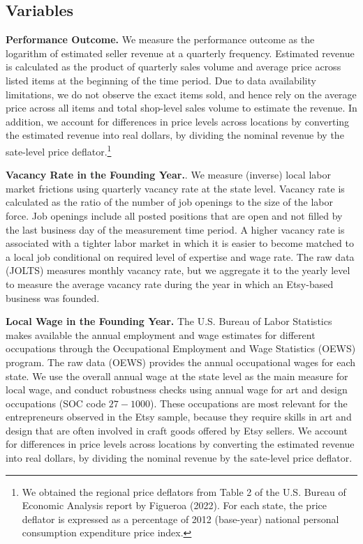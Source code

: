 \documentclass[letterpaper,12pt]{article}
\begin{document}

\subsection{Variables}

\textbf{Performance Outcome.} We measure the performance outcome as the logarithm of estimated seller revenue at a quarterly frequency. Estimated revenue is calculated as the product of quarterly sales volume and average price across listed items at the beginning of the time period. Due to data availability limitations, we do not observe the exact items sold, and hence rely on the average price across all items and total shop-level sales volume to estimate the revenue. In addition, we account for differences in price levels across locations by converting the estimated revenue into real dollars, by dividing the nominal revenue by the sate-level price deflator.\footnote{We obtained the regional price deflators from Table 2 of the U.S. Bureau of Economic Analysis report by Figueroa (2022). For each state, the price deflator is expressed as a percentage of 2012 (base-year) national personal consumption expenditure price index.}

\textbf{Vacancy Rate in the Founding Year.}. We measure (inverse) local labor market frictions using quarterly vacancy rate at the state level. Vacancy rate is calculated as the ratio of the number of job openings to the size of the labor force. Job openings include all posted positions that are open and not filled by the last business day of the measurement time period. A higher vacancy rate is associated with a tighter labor market in which it is easier to become matched to a local job conditional on required level of expertise and wage rate. The raw data (JOLTS) measures monthly vacancy rate, but we aggregate it to the yearly level to measure the average vacancy rate during the year in which an Etsy-based business was founded.

\textbf{Local Wage in the Founding Year.} The U.S. Bureau of Labor Statistics makes available the annual employment and wage estimates for different occupations through the Occupational Employment and Wage Statistics (OEWS) program. The raw data (OEWS) provides the annual occupational wages for each state. We use the overall annual wage at the state level as the main measure for local wage, and conduct robustness checks using annual wage for art and design occupations (SOC code $27-1000$). These occupations are most relevant for the entrepreneurs observed in the Etsy sample, because they require skills in art and design that are often involved in craft goods offered by Etsy sellers. We account for differences in price levels across locations by converting the estimated revenue into real dollars, by dividing the nominal revenue by the sate-level price deflator.
\end{document}
